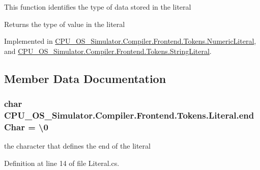 This function identifies the type of data stored in the literal 

\begin{DoxyReturn}{Returns}
the type of value in the literal
\end{DoxyReturn}


Implemented in \hyperlink{class_c_p_u___o_s___simulator_1_1_compiler_1_1_frontend_1_1_tokens_1_1_numeric_literal_ac00d8a0002a5a291fba5713d385d11a6}{C\+P\+U\+\_\+\+O\+S\+\_\+\+Simulator.\+Compiler.\+Frontend.\+Tokens.\+Numeric\+Literal}, and \hyperlink{class_c_p_u___o_s___simulator_1_1_compiler_1_1_frontend_1_1_tokens_1_1_string_literal_ad4121c2eda9ab84f08bb0c51996c96cb}{C\+P\+U\+\_\+\+O\+S\+\_\+\+Simulator.\+Compiler.\+Frontend.\+Tokens.\+String\+Literal}.



\subsection{Member Data Documentation}
\hypertarget{class_c_p_u___o_s___simulator_1_1_compiler_1_1_frontend_1_1_tokens_1_1_literal_ab07076b3a3eaae7e88f664904aaa341f}{}
\subsubsection[{end\+Char}]{\setlength{\rightskip}{0pt plus 5cm}char C\+P\+U\+\_\+\+O\+S\+\_\+\+Simulator.\+Compiler.\+Frontend.\+Tokens.\+Literal.\+end\+Char = \textquotesingle{}\textbackslash{}0\textquotesingle{}\hspace{0.3cm}{\ttfamily [protected]}}\label{class_c_p_u___o_s___simulator_1_1_compiler_1_1_frontend_1_1_tokens_1_1_literal_ab07076b3a3eaae7e88f664904aaa341f}


the character that defines the end of the literal 



Definition at line 14 of file Literal.\+cs.

\hypertarget{class_c_p_u___o_s___simulator_1_1_compiler_1_1_frontend_1_1_tokens_1_1_literal_ae93e9ee8a14f8f8fed07f5e9a8232b5a}{}
